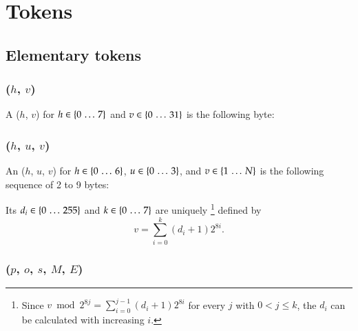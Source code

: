 
\section{Tokens}
\label{sec:tokens}

\subsection{Elementary tokens}

\subsubsection{\DborMinimalToken(\texorpdfstring{$h$, $v$}{h, v})}
\hypertarget{sec:def:MinimalToken}{}

A \DborMinimalToken($h$, $v$) for $h \in \{0 \,\ldots\, 7\}$ and $v \in \{0 \,\ldots\, 31\}$
is the following byte:



\subsubsection{\DborNaturalToken(\texorpdfstring{$h$, $u$, $v$}{h, u, v})}
\hypertarget{sec:def:NaturalToken}{}

An \DborNaturalToken($h$, $u$, $v$)
for $h \in \{0 \,\ldots\, 6\}$,
$u \in \{0 \,\ldots\, 3\}$,
and $v \in \{1 \,\ldots\, N\}$
is the following sequence of 2 to 9 bytes:


Its $d_i \in \{0 \,\ldots\, 255\}$ and $k \in \{0 \,\ldots\, 7\}$ are uniquely%
\footnote{%
    Since $v \bmod 2^{8 j} = \sum_{i = 0}^{j - 1} (d_i + 1) 2^{8 i}$ for every $j$ with $0 < j \le k$,
    the $d_i$ can be calculated with increasing $i$.
}
defined by
\begin{equation}
    v =\sum_{i = 0}^k (d_i + 1) 2^{8 i}.
\end{equation}


\subsubsection{\DborBinaryRationalToken(\texorpdfstring{$p$, $o$, $s$, $M$, $E$}{p, o, s, M, E})}
\hypertarget{sec:def:BinaryRationalToken}{}

